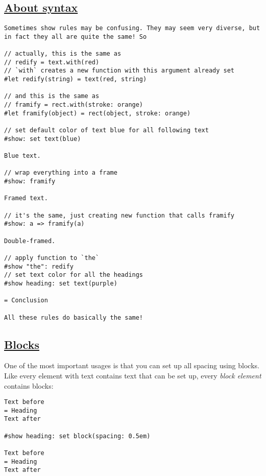 \pandocbounded{}

\subsection{\texorpdfstring{\hyperref[about-syntax]{About
syntax}}{About syntax}}\label{about-syntax}

\begin{verbatim}
Sometimes show rules may be confusing. They may seem very diverse, but in fact they all are quite the same! So

// actually, this is the same as
// redify = text.with(red)
// `with` creates a new function with this argument already set
#let redify(string) = text(red, string)

// and this is the same as
// framify = rect.with(stroke: orange)
#let framify(object) = rect(object, stroke: orange)

// set default color of text blue for all following text
#show: set text(blue)

Blue text.

// wrap everything into a frame
#show: framify

Framed text.

// it's the same, just creating new function that calls framify
#show: a => framify(a)

Double-framed.

// apply function to `the`
#show "the": redify
// set text color for all the headings
#show heading: set text(purple)

= Conclusion

All these rules do basically the same!
\end{verbatim}

\pandocbounded{}

\subsection{\texorpdfstring{\hyperref[blocks]{Blocks}}{Blocks}}\label{blocks}

One of the most important usages is that you can set up all spacing
using blocks. Like every element with text contains text that can be set
up, every \emph{block element} contains blocks:

\begin{verbatim}
Text before
= Heading
Text after

#show heading: set block(spacing: 0.5em)

Text before
= Heading
Text after
\end{verbatim}

